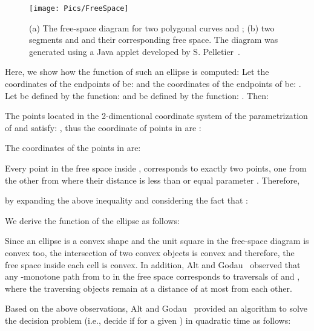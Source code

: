 \documentclass[12pt]{dalthesis}
\begin{document}
\begin{figure}[h]
	\centering
	\texttt{[image: Pics/FreeSpace]}
	\caption{ (a) The free-space diagram for two polygonal curves  and ;
	(b) two segments  and  and their corresponding free space.
	The diagram was generated using a Java applet developed by S. Pelletier~\cite{FDApplet}.}
	\label{fig:diagram}
\end{figure}
 





	Here, we show how the function of such an ellipse is computed:
	Let the coordinates of the endpoints of  be: 
	and the coordinates of
	the endpoints of  be: . 
	Let  be defined by the function: 
	and  be defined by the function: . Then: 
	
	
	The points located in the 2-dimentional coordinate system of the parametrization of 
	and  satisfy: , thus the coordinate of points in  are :


\abovedisplayshortskip=0pt
\belowdisplayshortskip=0pt
\abovedisplayskip=0pt
\belowdisplayskip=0pt

	
	The coordinates of the points in  are: 
	
	Every point in the free space inside , corresponds to exactly two points, one from 
	the other from  where their distance is less than or equal parameter . Therefore, 
	
	by expanding the above inequality and considering the fact that :
	
	We derive the function of the ellipse as follows:
		
	Since an ellipse is a convex  shape and the unit 
	square in the free-space diagram is convex too, 
	the intersection of two convex objects is convex and therefore, 
the free space inside each cell is convex. 
In addition, Alt and Godau~\cite{AltG95} observed that any -monotone 
path from  to  in the free space corresponds to traversals of  and , 
where the traversing objects remain at a distance of at most  from each other.


Based on the above observations, 
Alt and Godau~\cite{AltG95} provided an algorithm
to solve the decision problem (i.e., decide if  for a given ) in quadratic time as follows:
\end{document}
